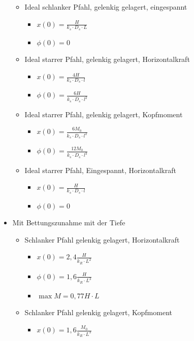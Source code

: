 \documentclass[fleqn,twoside]{article}
\begin{document}
\begin{itemize}
\begin{itemize}
        \item Ideal schlanker Pfahl, gelenkig gelagert, eingespannt
        \begin{itemize}
            \item $x(0)=\frac{H}{k_s\cdot D_s\cdot L}$
            \item $\phi(0)=0$
        \end{itemize}
        \item Ideal starrer Pfahl, gelenkig gelagert, Horizontalkraft
        \begin{itemize}
            \item $x(0)=\frac{4H}{k_s\cdot D_s\cdot l}$
            \item $\phi(0)=\frac{6H}{k_s\cdot D_s\cdot l^2}$
        \end{itemize}
        \item Ideal starrer Pfahl, gelenkig gelagert, Kopfmoment
        \begin{itemize}
            \item $x(0)=\frac{6M_0}{k_s\cdot D_s\cdot l^2}$
            \item $\phi(0)=\frac{12M_0}{k_s\cdot D_s\cdot l^3}$
        \end{itemize}
        \item Ideal starrer Pfahl, Eingespannt, Horizontalkraft
        \begin{itemize}
            \item $x(0)=\frac{H}{k_s\cdot D_s\cdot l}$
            \item $\phi(0)=0$
        \end{itemize}
    \end{itemize}
    \item Mit Bettungszunahme mit der Tiefe
    \begin{itemize}
        \item Schlanker Pfahl gelenkig gelagert, Horizontalkraft
        \begin{itemize}
            \item $x(0)=2,4\frac{H}{k_R\cdot L^2}$
            \item $\phi(0)=1,6\frac{H}{k_R\cdot L^3}$
            \item $\max M=0,77H\cdot L$
        \end{itemize}
        \item Schlanker Pfahl gelenkig gelagert, Kopfmoment
        \begin{itemize}
            \item $x(0)=1,6\frac{M_0}{k_R\cdot L^3}$

\end{itemize}
\end{itemize}
\end{itemize}
\end{document}
